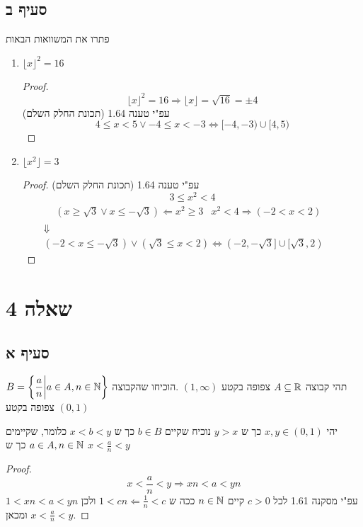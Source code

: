 \documentclass{article}
\begin{document}
	\subsection*{סעיף ב}
	פתרו את המשוואות הבאות
	\begin{enumerate}[i]
		\item $\lfloor x \rfloor^2 = 16$
		\begin{proof}
			\[
				\lfloor x \rfloor^2 = 16 \Rightarrow
				\lfloor x \rfloor = \sqrt{16} = \pm 4
			\]
			עפ"י טענה 1.64 (תכונת החלק השלם)
			\[4 \leq x < 5 \lor -4 \leq x < -3 \iff [-4, -3) \cup [4,5) \]
		\end{proof}
		\item $\lfloor x^2 \rfloor = 3$
		\begin{proof}
			עפ"י טענה 1.64 (תכונת החלק השלם)
			\[ 3 \leq x^2 < 4 \]
			\begin{gather*}
				\begin{flalign*}
					&(x \geq \sqrt{3} \lor x \leq - \sqrt{3}) \Leftarrow x^2 \geq 3
					&x^2 < 4 \Rightarrow  (-2 < x < 2) &&
				\end{flalign*} \\
				\Downarrow \\
				(-2 < x \leq -\sqrt{3}) \lor (\sqrt{3} \leq x < 2)  \iff
					(-2, -\sqrt{3}] \cup [\sqrt{3}, 2)
			\end{gather*}
		\end{proof}
	\end{enumerate}

	\pagebreak
	\section*{שאלה 4}
	\subsection*{סעיף א}
	תהי קבוצה $A \subseteq \mathbb{R}$ צפופה בקטע $(1, \infty)$ .הוכיחו שהקבוצה
	 $\displaystyle{B = \bigg\{ \dfrac{a}{n} \bigg| a \in A, n \in \mathbb{N}\bigg\}}$
	 צפופה בקטע $(0,1)$

	 יהי $x,y \in (0,1)$ כך ש $y > x$ נוכיח שקיים $b \in B$ כך ש $x < b < y$ כלומר, שקיימים $a \in A, n \in \mathbb{N}$ כך ש $x < \frac{a}{n} < y$
	 \begin{proof}
	 	\[
	 		x < \frac{a}{n} < y \Rightarrow
	 		xn < a < yn
	 	 \]
	 	 עפ"י מסקנה 1.61 לכל $c > 0$ קיים $n \in \mathbb{N}$ ככה ש
	 	 $1 < cn \Leftarrow \frac{1}{n} < c$
	 	 ולכן $1 < xn < a < yn$ ומכאן $x < \frac{a}{n} < y$.
	 \end{proof}
\end{document}
